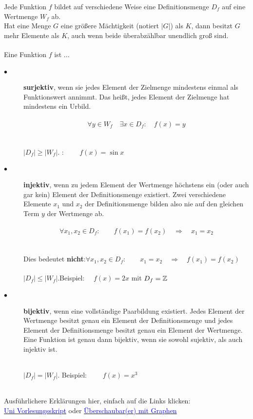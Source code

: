 \begin{Definition}
Jede Funktion $f$ bildet auf verschiedene Weise eine Definitionsmenge $D_{f}$ auf eine Wertmenge $W_{f}$ ab. \\Hat eine Menge $G$ eine größere Mächtigkeit (notiert $|G|$) als $K$, dann besitzt $G$ mehr Elemente als $K$, auch wenn beide überabzählbar unendlich groß sind. \\\\
Eine Funktion $f$ ist ...
\begin{description}
\item[$\bullet$] \textbf{surjektiv}, wenn sie jedes Element der Zielmenge mindestens einmal als Funktionswert annimmt. Das heißt, jedes Element der Zielmenge hat mindestens ein Urbild.\\\\
$$\forall y \in W_{f} \quad \exists x \in D_{f}:\quad f(x)=y $$\\\\
$|D_{f}| \geq |W_{f}|$. \quadBeispiel: $\qquad f(x)=\sin{x} $\\

\item[$\bullet$] \textbf{injektiv}, wenn zu jedem Element der Wertmenge höchstens ein (oder auch gar kein) Element der Definitionsmenge existiert. Zwei verschiedene Elemente $x_{1}$ und $x_{2}$ der Definitionsmenge bilden also nie auf den gleichen Term $y$ der Wertmenge ab.\\\\
$$\forall x_{1}, x_{2} \in D_{f} :\qquad f(x_{1}) = f(x_{2}) \quad \Rightarrow \quad x_{1}=x_{2} $$\\\\
\danger \quad Dies bedeutet \textbf{nicht}:\quad $\forall x_{1}, x_{2} \in D_{f} :\qquad x_{1} = x_{2} \quad\Rightarrow\quad f(x_{1}) = f(x_{2}) $ \\\\
$|D_{f}| \leq |W_{f}|$.\quad Beispiel: $\quad f(x)=2x$ \quad mit \quad $D_{f}=\mathbb{Z}$\\

\item[$\bullet$] \textbf{bijektiv}, wenn eine vollständige Paarbildung existiert. Jedes Element der Wertmenge besitzt genau ein Element der Definitionsmenge und jedes Element der Definitionsmenge besitzt genau ein Element der Wertmenge. Eine Funktion ist genau dann bijektiv, wenn sie sowohl sujektiv, als auch injektiv ist.\\\

$|D_{f}| = |W_{f}|$. \quad Beispiel: $\qquad f(x)=x^3 $\\\\
\end{description}
\end{Definition}
\begin{Bemerkung}
Ausführlichere Erklärungen hier, einfach auf die Links klicken:\\
\href{http://www.math.uni-konstanz.de/~huynh/Vorkurs2015/Vorlesung_12.pdf}{\textcolor{blue}{Uni Vorlesungsskript}} \qquad oder \qquad
\href{https://www.mathe-online.at/mathint/fun1/i_isb.html}{\textcolor{blue}{Überschaubar(er) mit Graphen}} \\
\end{Bemerkung}


